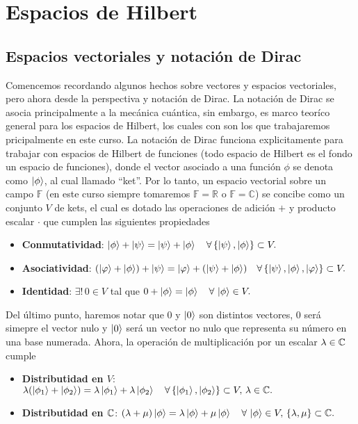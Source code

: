 \documentclass[main.tex]{subfiles}
\begin{document}
\chapter{Espacios de Hilbert}

\section{Espacios vectoriales y notación de Dirac}

\noindent Comencemos recordando algunos hechos sobre vectores y espacios vectoriales, pero ahora desde la perspectiva y notación de Dirac. La notación de Dirac se asocia principalmente a la mecánica cuántica, sin embargo, es marco teoríco general para los espacios de Hilbert, los cuales con son los que trabajaremos pricipalmente en este curso. La notación de Dirac funciona explicitamente para trabajar con espacios de Hilbert de funciones (todo espacio de Hilbert es el fondo un espacio de funciones), donde el vector asociado a una función $\phi$ se denota como $\ket{\phi}$, al cual llamado ``ket''. Por lo tanto, un espacio vectorial sobre un campo \(\mathbb{F}\) (en este curso siempre tomaremos \(\mathbb{F} = \mathbb{R}\) o \(\mathbb{F} = \mathbb{C}\)) se concibe como un conjunto \(V\) de kets, el cual es dotado las operaciones de adición \(+\) y producto escalar \(\cdot\) que cumplen las siguientes propiedades

\begin{itemize}
    \item \textbf{Conmutatividad}: \(\ket{\phi} + \ket{\psi} = \ket{\psi} + \ket{\phi}\quad\forall\,\{\ket{\psi},\ket{\phi}\}\subset V.\)
    \item \textbf{Asociatividad}: \((\ket{\varphi}+\ket{\phi}) + \ket{\psi} = \ket{\varphi}+(\ket{\psi} + \ket{\phi})\quad\forall\,\{\ket{\psi},\ket{\phi},\ket{\varphi}\}\subset V.\)
    \item \textbf{Identidad}: \(\exists! \, 0 \in V\) tal que \(0 + \ket{\phi} = \ket{\phi}\quad\forall\,\ket{\phi}\in V.\)
\end{itemize}

Del último punto, haremos notar que $0$ y $\ket{0}$ son distintos vectores, $0$ será simepre el vector nulo y $\ket{0}$ será un vector no nulo que representa su número en una base numerada. Ahora, la operación de multiplicación por un escalar \(\lambda \in \mathbb C \) cumple

\begin{itemize}
    \item \textbf{Distributidad en \(V\)}: \(\lambda(\ket{\phi_1} + \ket{\phi_2}) = \lambda\ket{\phi_1} + \lambda\ket{\phi_2}\quad\forall\,\{\ket{\phi_1},\ket{\phi_2}\}\subset V,\,\lambda\in\mathbb C .\)
    \item \textbf{Distributidad en \(\mathbb C \)}: \((\lambda + \mu)\ket{\phi} = \lambda\ket{\phi} + \mu\ket{\phi}\quad\forall\,\ket{\phi}\in V,\,\{\lambda,\mu\}\subset\mathbb C .\)
\end{itemize}
\end{document}
